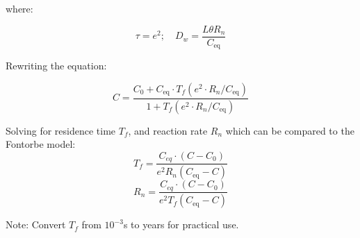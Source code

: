 \begin{tcolorbox}
{\begin{multicols}{2}
\end{multicols}

\begin{multicols}{2}

where:

\columnbreak
\begin{equation}
\tau = e^2; \quad D_w = \frac{L\theta R_n}{C_{\text{eq}}}
\end{equation}

\end{multicols}

\begin{multicols}{2}

Rewriting the equation:

\columnbreak

\begin{equation}
    C = \frac{C_{\text{0}} + C_{\text{eq}} \cdot T_f\left(e^2 \cdot R_n / C_{\text{eq}}\right)}{1 + T_f\left(e^2 \cdot R_n / C_{\text{eq}}\right)}
\end{equation}

\end{multicols}

\begin{multicols}{2}

Solving for residence time \( T_f \), and reaction rate \( R_n \) which can be compared to the Fontorbe model:
\columnbreak
\begin{equation}
    T_f = \frac{C_{eq} \cdot \left(C - C_0\right)}{e^2 R_n \left( C_{\text{eq}} - C \right)}
\end{equation}
\begin{equation}
    R_n = \frac{C_{eq} \cdot \left(C - C_0\right)}{e^2 T_f \left( C_{\text{eq}} - C \right)}
\end{equation}

\end{multicols}

Note: Convert \( T_f \) from \( 10^{-3} \)s to years for practical use.\\

}
\end{tcolorbox}
